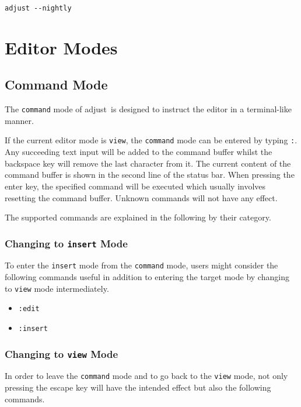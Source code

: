 \documentclass[11pt, a4paper, british]{scrartcl}
\DeclareRobustCommand{\adjust}{\textsf{adjust}}
\begin{document}
\begin{lstlisting}[caption = Updating \adjust, label = lst:update]
adjust --nightly
\end{lstlisting}


\newpage
\section{Editor Modes}
\label{sec:editor-modes}
\subsection{Command Mode}
\label{sec:command-mode}
The \texttt{command} mode of \adjust\ is designed to instruct the editor in a
terminal-like manner.

If the current editor mode is \texttt{view}, the \texttt{command} mode can be
entered by typing \texttt{:}.  Any succeeding text input will be added to the
command buffer whilst the backspace key will remove the last character from it.
The current content of the command buffer is shown in the second line of the
status bar.  When pressing the enter key, the specified command will be executed
which usually involves resetting the command buffer.  Unknown commands will not
have any effect.

The supported commands are explained in the following by their category.

\subsubsection{Changing to \texttt{insert} Mode}
\label{sec:changing-to-insert-mode}
To enter the \texttt{insert} mode from the \texttt{command} mode, users might
consider the following commands useful in addition to entering the target mode
by changing to \texttt{view} mode intermediately.

\begin{itemize}
\item \texttt{:edit}
\item \texttt{:insert}
\end{itemize}

\subsubsection{Changing to \texttt{view} Mode}
\label{sec:changing-to-view-mode}
In order to leave the \texttt{command} mode and to go back to the \texttt{view}
mode, not only pressing the escape key will have the intended effect but also
the following commands.
\end{document}
